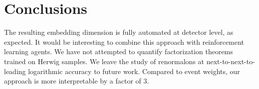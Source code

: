 \section{Conclusions}\label{sec:conclusions}

The resulting embedding dimension is fully automated at detector level,
as expected. It would be interesting to combine this approach with
reinforcement learning agents. We have not attempted to quantify
factorization theorems trained on Herwig samples. We leave the study of
renormalons at next-to-next-to-leading logarithmic accuracy to future
work. Compared to event weights, our approach is more interpretable by a
factor of 3.

